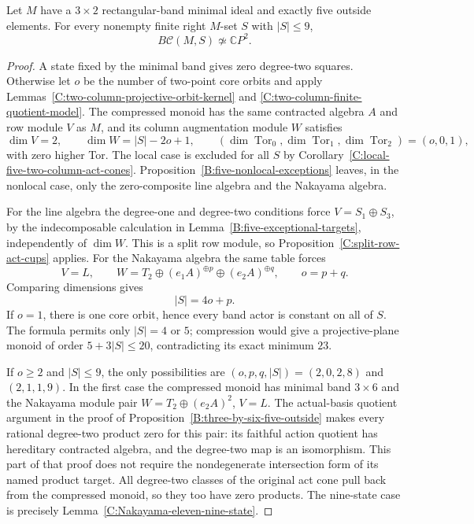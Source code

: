 \begin{theorem}
\label{C:eleven-three-row-nine-state}
Let $M$ have a $3\times2$ rectangular-band minimal ideal and
exactly five outside elements.  For every nonempty finite right
$M$-set $S$ with $|S|\leq9$,
\[
 B\mathcal C(M,S)\not\simeq\mathbb CP^2.
\]
\end{theorem}
\begin{proof}
A state fixed by the minimal band gives zero degree-two squares.
Otherwise let $o$ be the number of two-point core orbits and
apply Lemmas~\ref{C:two-column-projective-orbit-kernel} and
\ref{C:two-column-finite-quotient-model}.  The compressed monoid
has the same contracted algebra $A$ and row module $V$ as $M$,
and its column augmentation module $W$ satisfies
\[
 \dim V=2,\qquad \dim W=|S|-2o+1,
 \qquad(\dim\operatorname{Tor}_0,\dim\operatorname{Tor}_1,
        \dim\operatorname{Tor}_2)=(o,0,1),
\]
with zero higher Tor.  The local case is excluded for all $S$
by Corollary~\ref{C:local-five-two-column-act-cones}.
Proposition~\ref{B:five-nonlocal-exceptions} leaves, in the
nonlocal case, only the zero-composite line algebra and the
Nakayama algebra.

For the line algebra the degree-one and degree-two conditions
force $V=S_1\oplus S_3$, by the indecomposable calculation in
Lemma~\ref{B:five-exceptional-targets}, independently of
$\dim W$.  This is a split row module, so
Proposition~\ref{C:split-row-act-cups} applies.
For the Nakayama algebra the same table forces
\[
 V=L,\qquad W=T_2\oplus(e_1A)^{\oplus p}
                    \oplus(e_2A)^{\oplus q},\qquad
 o=p+q.
\]
Comparing dimensions gives
\[
 |S|=4o+p.
\]
If $o=1$, there is one core orbit, hence every band actor is
constant on all of $S$.  The formula permits only $|S|=4$ or
$5$; compression would give a projective-plane monoid of order
$5+3|S|\leq20$, contradicting its exact minimum $23$.

If $o\geq2$ and $|S|\leq9$, the only possibilities are
$(o,p,q,|S|)=(2,0,2,8)$ and $(2,1,1,9)$.
In the first case the compressed monoid has minimal band
$3\times6$ and the Nakayama module pair
$W=T_2\oplus(e_2A)^2$, $V=L$.
The actual-basis quotient argument in the proof of
Proposition~\ref{B:three-by-six-five-outside} makes every
rational degree-two product zero for this pair: its faithful
action quotient has hereditary contracted algebra, and the
degree-two map is an isomorphism.  This part of that proof
does not require the nondegenerate intersection form of its
named product target.  All degree-two classes of the original
act cone pull back from the compressed monoid, so they too
have zero products.  The nine-state case is precisely
Lemma~\ref{C:Nakayama-eleven-nine-state}.
\end{proof}

